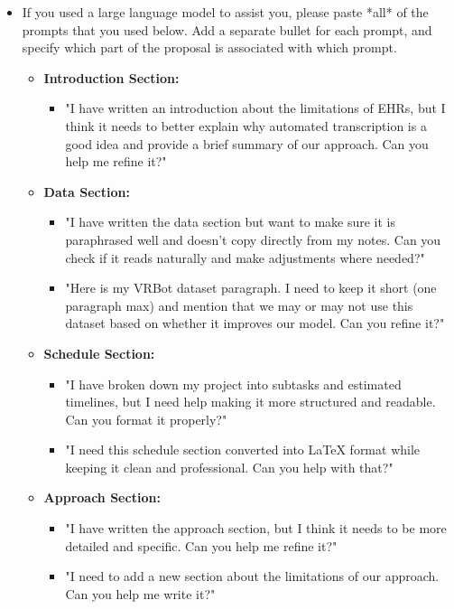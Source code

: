 \documentclass[11pt,a4paper]{article}
\begin{document}
\begin{itemize}
    \item  If you used a large language model to assist you, please paste *all* of the prompts that you used below. Add a separate bullet for each prompt, and specify which part of the proposal is associated with which prompt.
    \begin{itemize}
        \item \textbf{Introduction Section:}  
        \begin{itemize}
            \item "I have written an introduction about the limitations of EHRs, but I think it needs to better explain why automated transcription is a good idea and provide a brief summary of our approach. Can you help me refine it?"  
        \end{itemize}
        
        \item \textbf{Data Section:}  
        \begin{itemize}
            \item "I have written the data section but want to make sure it is paraphrased well and doesn’t copy directly from my notes. Can you check if it reads naturally and make adjustments where needed?"  
            \item "Here is my VRBot dataset paragraph. I need to keep it short (one paragraph max) and mention that we may or may not use this dataset based on whether it improves our model. Can you refine it?"  
        \end{itemize}
        
        \item \textbf{Schedule Section:}  
        \begin{itemize}
            \item "I have broken down my project into subtasks and estimated timelines, but I need help making it more structured and readable. Can you format it properly?"  
            \item "I need this schedule section converted into LaTeX format while keeping it clean and professional. Can you help with that?"  
        \end{itemize}
        
        \item \textbf{Approach Section:}  
        \begin{itemize}
            \item "I have written the approach section, but I think it needs to be more detailed and specific. Can you help me refine it?"
            \item "I need to add a new section about the limitations of our approach. Can you help me write it?"
        \end{itemize}
    \end{itemize}


\end{itemize}
\end{document}
